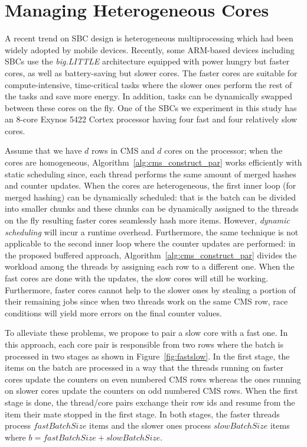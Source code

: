 \documentclass[10pt, review=true,sigconf]{acmart}
\begin{document}
\section{Managing Heterogeneous Cores} \label{sec:load}

A recent trend on SBC design is heterogeneous multiprocessing which had been widely adopted by mobile devices. Recently, some ARM-based devices including SBCs use the {\em big.LITTLE} architecture equipped with power hungry but faster cores, as well as battery-saving but slower cores. The faster cores are suitable for compute-intensive, time-critical tasks where the slower ones perform the rest of the tasks and save more energy. In addition, tasks can be dynamically swapped between these cores on the fly. One of the SBCs we experiment in this study has an 8-core Exynos 5422 Cortex processor having four fast and four relatively slow cores. 

Assume that we have $d$ rows in CMS and $d$ cores on the processor; when the cores are homogeneous, Algorithm~\ref{alg:cms_construct_par} works efficiently with static scheduling since, each thread performs the same amount of merged hashes and counter updates. When the cores are heterogeneous, the first inner loop (for merged hashing) can be dynamically  scheduled: that is the batch can be divided into smaller chunks and these chunks can be dynamically assigned to the threads on the fly resulting faster cores seamlessly hash more items. However, {\em dynamic scheduling} will incur a runtime overhead. Furthermore, the same technique is not applicable to the second inner loop where the counter updates are performed: in the proposed buffered approach, Algorithm~\ref{alg:cms_construct_par} divides the workload among the threads by assigning each row to a different one. When the fast cores are done with the updates, the slow cores will still be working. Furthermore, faster cores cannot help to the slower ones by stealing a portion of their remaining jobs since when two threads work on the same CMS row, race conditions will yield more errors on the final counter values. 

To alleviate these problems, we propose to pair a slow core with a fast one. In this approach, each core pair is responsible from two rows where the batch is processed in two stages as shown in Figure~\ref{fig:fastslow}. In the first stage, the items on the batch are processed in a way that the threads running on faster cores update the counters on even numbered CMS rows whereas the ones running on slower cores update the counters on odd numbered CMS rows. When the first stage is done, the thread/core pairs exchange their row ids and resume from the item their mate stopped in the first stage. In both stages, the faster threads process $fastBatchSize$ items and the slower ones process $slowBatchSize$ items where $b = fastBatchSize + slowBatchSize.$
\end{document}
